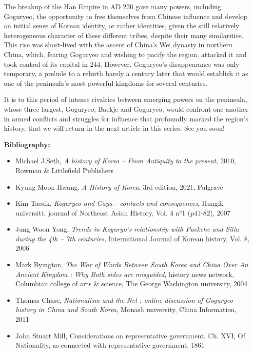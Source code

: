 \documentclass[11pt,a4paper]{article}
\begin{document}
The breakup of the Han Empire in AD 220 gave many powers, including Goguryeo, the opportunity to free themselves from Chinese influence and develop an initial sense of Korean identity, or rather identities, given the still relatively heterogeneous character of these different tribes, despite their many similarities. This rise was short-lived with the ascent of China's Wei dynasty in northern China, which, fearing Goguryeo and wishing to pacify the region, attacked it and took control of its capital in 244. However, Goguryeo's disappearance was only temporary, a prelude to a rebirth barely a century later that would establish it as one of the peninsula's most powerful kingdoms for several centuries.

It is to this period of intense rivalries between emerging powers on the peninsula, whose three largest, Goguryeo, Baekje and Goguryeo, would confront one another in armed conflicts and struggles for influence that profoundly marked the region's history, that we will return in the next article in this series. See you soon!

\textbf{Bibliography:}

\begin{itemize}
\item
  Michael J.Seth, \emph{A history of Korea -- From Antiquity to the present}, 2010, Rowman \& Littlefield Publishers
\item
  Kyung Moon Hwang, \emph{A History of Korea}, 3rd edition, 2021, Palgrave
\item
  Kim Taesik, \emph{Koguryeo and Gaya - contacts and consequences}, Hungik universitt, journal of Northeast Asian History, Vol. 4 n°1 (p41-82), 2007
\item
  Jung Woon Yong, \emph{Trends in Koguryo's relationship with Paekche and Silla during the 4th -- 7th centuries}, International Journal of Korean history, Vol. 8, 2006
\item
  Mark Byington, \emph{The War of Words Between South Korea and China Over An Ancient Kingdom : Why Both sides are misguided}, history news network, Columbian college of arts \& science, The George Washington university, 2004
\item
  Thomas Chase, \emph{Nationalism and the Net} \emph{: online discussion of Goguryeo history in China and South Korea}, Monash university, China Information, 2011
\item
  John Stuart Mill, Considerations on representative government, Ch. XVI, Of Nationality, as connected with representative government, 1861
\end{itemize}
\end{document}
